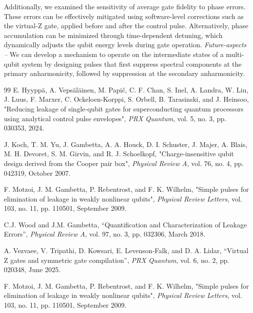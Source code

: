 \documentclass[twocolumn]{article}
\begin{document}
Additionally, we examined the sensitivity of average gate fidelity to phase errors. These errors can be effectively mitigated using software-level corrections such as the virtual-Z gate, applied before and after the control pulse. Alternatively, phase accumulation can be minimized through time-dependent detuning, which dynamically adjusts the qubit energy levels during gate operation.  
\newline \newline \noindent
\textit{Future-aspects --} We can develop a mechanism to operate on the intermediate states of a multi-qubit system by designing pulses that first suppress spectral components at the primary anharmonicity, followed by suppression at the secondary anharmonicity.
\newline \newline 

\vspace{30cm}
\begin{thebibliography}{99}
E. Hyyppä, A. Vepsäläinen, M. Papič, C. F. Chan, S. Inel, A. Landra, W. Liu, J. Luus, F. Marxer, C. Ockeloen-Korppi, S. Orbell, B. Tarasinski, and J. Heinsoo, 
"Reducing leakage of single-qubit gates for superconducting quantum processors using analytical control pulse envelopes", 
\textit{PRX Quantum}, vol. 5, no. 3, pp. 030353, 2024.

J. Koch, T. M. Yu, J. Gambetta, A. A. Houck, D. I. Schuster, J. Majer, A. Blais, M. H. Devoret, S. M. Girvin, and R. J. Schoelkopf, 
"Charge-insensitive qubit design derived from the Cooper pair box", 
\textit{Physical Review A}, vol. 76, no. 4, pp. 042319, October 2007.

F. Motzoi, J. M. Gambetta, P. Rebentrost, and F. K. Wilhelm, 
"Simple pulses for elimination of leakage in weakly nonlinear qubits", 
\textit{Physical Review Letters}, vol. 103, no. 11, pp. 110501, September 2009.

C.J. Wood and J.M. Gambetta,
“Quantification and Characterization of Leakage Errors”,
\textit{Physical Review A}, vol. 97, no. 3, pp. 032306, March 2018.

A. Vezvaee, V. Tripathi, D. Kowsari, E. Levenson‑Falk, and D. A. Lidar,  
“Virtual Z gates and symmetric gate compilation”,  
\textit{PRX Quantum}, vol. 6, no. 2, pp. 020348, June 2025.

F. Motzoi, J. M. Gambetta, P. Rebentrost, and F. K. Wilhelm, 
"Simple pulses for elimination of leakage in weakly nonlinear qubits", 
\textit{Physical Review Letters}, vol. 103, no. 11, pp. 110501, September 2009.
\end{thebibliography}
\end{document}
